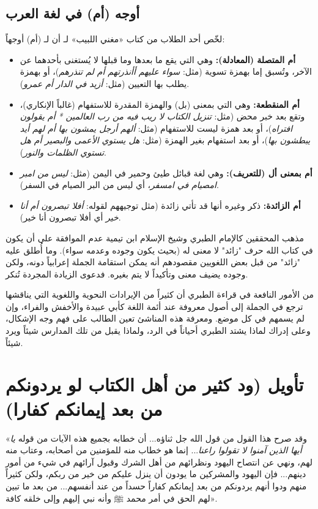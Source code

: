 \subsection{أوجه (أم) في لغة العرب}
لخّص أحد الطلاب من كتاب «مغني اللبيب» لـ  أن لـ (أم) أوجهاً:
\begin{itemize}
    \item \textbf{أم المتصلة (المعادلة):} وهي التي يقع ما بعدها وما قبلها لا يُستغنى بأحدهما عن الآخر، وتُسبق إما بهمزة تسوية (مثل: \textit{سواء عليهم أأنذرتهم أم لم تنذرهم})، أو بهمزة يطلب بها التعيين (مثل: \textit{أزيد في الدار أم عمرو}).
    \item \textbf{أم المنقطعة:} وهي التي بمعنى (بل) والهمزة المقدرة للاستفهام (غالباً الإنكاري)، وتقع بعد خبر محض (مثل: \textit{تنزيل الكتاب لا ريب فيه من رب العالمين * أم يقولون افتراه})، أو بعد همزة ليست للاستفهام (مثل: \textit{ألهم أرجل يمشون بها أم لهم أيد يبطشون بها})، أو بعد استفهام بغير الهمزة (مثل: \textit{هل يستوي الأعمى والبصير أم هل تستوي الظلمات والنور}).
    \item \textbf{أم بمعنى أل (للتعريف):} وهي لغة قبائل طيئ وحمير في اليمن (مثل: \textit{ليس من امبر امصيام في امسفر}، أي ليس من البر الصيام في السفر).
    \item \textbf{أم الزائدة:} ذكر  وغيره أنها قد تأتي زائدة (مثل توجيههم لقوله: \textit{أفلا تبصرون أم أنا خير} أي أفلا تبصرون أنا خير).
\end{itemize}

\begin{fawaid}
مذهب المحققين كالإمام الطبري وشيخ الإسلام ابن تيمية عدم الموافقة على أن يكون في كتاب الله حرف "زائد" لا معنى له (بحيث يكون وجوده وعدمه سواء). وما أُطلق عليه "زائد" من قبل بعض اللغويين مقصودهم أنه يمكن استقامة الجملة إعرابياً دونه، ولكن وجوده يضيف معنى وتأكيداً لا يتم بغيره. فدعوى الزيادة المجردة تُنكر.
\end{fawaid}

\begin{fawaid}
من الأمور النافعة في قراءة الطبري أن كثيراً من الإيرادات النحوية واللغوية التي يناقشها ترجع في الجملة إلى أصول معروفة عند أئمة اللغة كأبي عبيدة والأخفش والفراء، وإن لم يسمهم في كل موضع. ومعرفة هذه المناشئ تعين الطالب على فهم وجه الإشكال، وعلى إدراك لماذا يشتد الطبري أحياناً في الرد، ولماذا يقبل من تلك المدارس شيئاً ويرد شيئاً.
\end{fawaid}

\separator

\section{تأويل (ود كثير من أهل الكتاب لو يردونكم من بعد إيمانكم كفارا)}
 «وقد صرح هذا القول من قول الله جل ثناؤه... أن خطابه بجميع هذه الآيات من قوله \textit{يا أيها الذين آمنوا لا تقولوا راعنا}... إنما هو خطاب منه للمؤمنين من أصحابه، وعتاب منه لهم، ونهي عن انتصاح اليهود ونظرائهم من أهل الشرك وقبول آرائهم في شيء من أمور دينهم... فإن اليهود والمشركين ما يودون أن ينزل عليكم من خير من ربكم، ولكن كثيراً منهم ودوا أنهم يردونكم من بعد إيمانكم كفاراً حسداً من عند أنفسهم... من بعد ما تبين لهم الحق في أمر محمد ﷺ وأنه نبي إليهم وإلى خلقه كافة».


